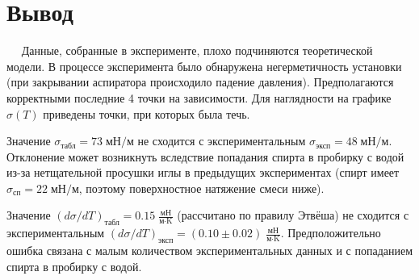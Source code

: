 \documentclass[12pt,a4paper]{article}
\begin{document}
	\section*{Вывод}
	
		$\quad$ Данные, собранные в эксперименте, плохо подчиняются теоретической модели. В процессе эксперимента было обнаружена негерметичность установки (при закрывании аспиратора происходило падение давления). Предполагаются корректными последние 4 точки на зависимости. Для наглядности на графике $\sigma (T)$ приведены точки, при которых была течь.
		
		Значение $\sigma_{\text{табл}} = 73 \; \text{мН}/\text{м}$ не сходится с экспериментальным $\sigma_{\text{эксп}} = 48 \; \text{мН}/\text{м}$. Отклонение может возникнуть вследствие попадания спирта в пробирку с водой из-за нетщательной просушки иглы в предыдущих экспериментах (спирт имеет $\sigma_{\text{сп}} = 22 \; \text{мН}/\text{м}$, поэтому поверхностное натяжение смеси ниже).
		
		Значение $(d\sigma/dT)_{\text{табл}} = 0.15 \; \frac{\text{мН}}{\text{м} \cdot \text{K}}$ (рассчитано по правилу Этвёша) не сходится с экспериментальным $(d\sigma/dT)_{\text{эксп}} = (0.10 \pm 0.02) \; \frac{\text{мН}}{\text{м} \cdot \text{K}}$. Предположительно ошибка связана с малым количеством экспериментальных данных и с попаданием спирта в пробирку с водой.
	
\end{document}
